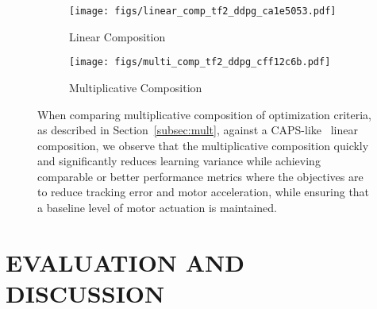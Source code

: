 \documentclass[letterpaper, 10 pt, conference]{ieeeconf} %
\begin{document}
\begin{figure*}[t]
    \centering
    \begin{subfigure}{.45\textwidth}
      \centering
      \texttt{[image: figs/linear\_comp\_tf2\_ddpg\_ca1e5053.pdf]}
      \caption{Linear Composition}
      \label{fig:lin_sim}
    \end{subfigure}%
    \begin{subfigure}{.45\textwidth}
        \centering
        \texttt{[image: figs/multi\_comp\_tf2\_ddpg\_cff12c6b.pdf]}
        \caption{Multiplicative Composition}
        \label{fig:mult_sim}
    \end{subfigure}
    \caption{When comparing multiplicative composition of optimization criteria, as described in Section~\ref{subsec:mult}, against a CAPS-like~\cite{mysore2021caps} linear composition, we observe that the multiplicative composition quickly and significantly reduces learning variance while achieving comparable or better performance metrics where the objectives are to reduce tracking error and motor acceleration, while ensuring that a baseline level of motor actuation is maintained.}
    \label{fig:mult_v_lin}
    \vspace{-1.4\baselineskip}
\end{figure*}




\section{EVALUATION AND DISCUSSION}\label{sec:Eval}
    
\end{document}
